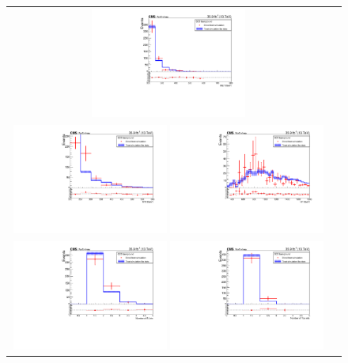 \begin{figure}[hp]
\begin{center}
\begin{tabular}{cc}
\includegraphics[width=0.49\textwidth]{sections/mc4/Backgrounds/QCD/figures/84sb/_met.pdf}\\
\includegraphics[width=0.49\textwidth]{sections/mc4/Backgrounds/QCD/figures/84sb/_mt2.pdf}
\includegraphics[width=0.49\textwidth]{sections/mc4/Backgrounds/QCD/figures/84sb/_ht.pdf}\\
\includegraphics[width=0.49\textwidth]{sections/mc4/Backgrounds/QCD/figures/84sb/_nbjets.pdf}
\includegraphics[width=0.49\textwidth]{sections/mc4/Backgrounds/QCD/figures/84sb/_ntopjets.pdf}

\end{tabular}
\end{center}
\end{figure}

